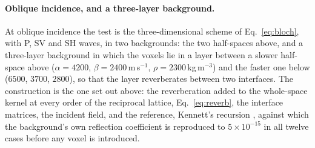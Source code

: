 \documentclass[11pt,a4paper]{article}
\begin{document}
\FloatBarrier

\paragraph{Oblique incidence, and a three-layer background.} At oblique incidence the test is the
three-dimensional scheme of Eq.~\eqref{eq:bloch}, with P, SV and SH waves, in two backgrounds: the two
half-spaces above, and a three-layer background in which the voxels lie in a layer between a slower
half-space above ($\alpha=4200$, $\beta=2400$\,m\,s$^{-1}$, $\rho=2300$\,kg\,m$^{-3}$) and the faster
one below ($6500$, $3700$, $2800$), so that the layer reverberates between two interfaces. The construction is the one set out above: the reverberation added to the whole-space kernel
at every order of the reciprocal lattice, Eq.~\eqref{eq:reverb}, the interface matrices, the
incident field, and the reference, Kennett's recursion \citep{Kennett1983}, against which the
background's own reflection coefficient is reproduced to $5\times10^{-15}$ in all twelve cases before
any voxel is introduced.
\end{document}
